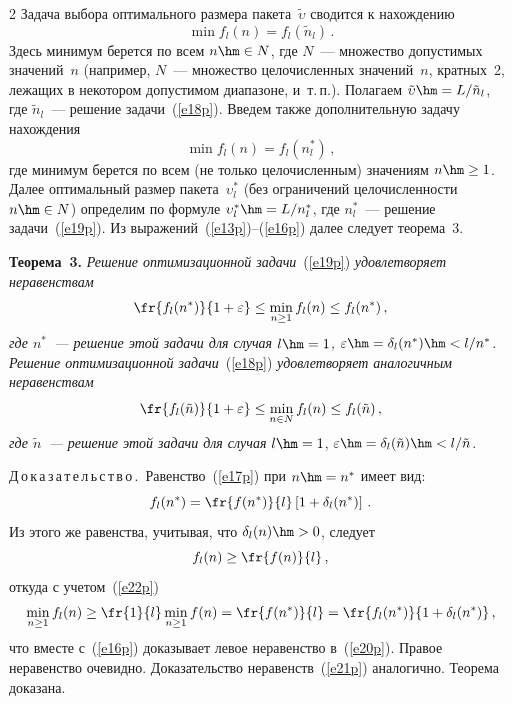 \begin{multicols}{2}
     Задача выбора оптимального размера пакета~$\tilde{\upsilon}$ сводится к 
нахождению 
     \begin{equation}
     \min f_l(n) =f_l\left(\tilde{n}_l\right)\,.
     \label{e18p}
     \end{equation}
Здесь минимум берется по всем $n\hm\in N$, где $N$~--- множество 
допустимых значений~$n$ (например, $N$~--- множество це\-ло\-чис\-лен\-ных 
значений~$n$, кратных~2, лежащих в некотором допустимом диапазоне, 
и~т.\,п.). Полагаем $\tilde{\upsilon}\hm=L/\tilde{n}_l$, где 
$\tilde{n}_l$~--- решение задачи~(\ref{e18p}). Введем также дополнительную 
задачу нахождения 
\begin{equation}
\min f_l(n) =f_l(n_l^*)\,,
\label{e19p}
\end{equation}
где минимум берется по всем (не только це\-ло\-чис\-лен\-ным) значениям 
$n\hm\geq 1$. Далее оптимальный размер пакета~$\upsilon_l^*$ (без 
ограничений це\-ло\-чис\-лен\-ности $n\hm\in N$) определим по формуле 
$\upsilon_l^*\hm=L/n_l^*$, где $n_l^*$~--- решение задачи~(\ref{e19p}). Из 
выражений~(\ref{e13p})--(\ref{e16p}) далее следует теорема~3.

\medskip

\noindent
\textbf{Теорема~3.} \textit{Решение оптимизационной задачи}~(\ref{e19p}) 
\textit{удовлетворяет неравенствам}
\begin{equation}
\fr{f_l(n^*)}{1+\varepsilon}\leq \min\limits_{n\geq 1} f_l(n)\leq f_l(n^*)\,,
\label{e20p} 
\end{equation}
\textit{где $n^*$~--- решение этой задачи для случая $l\hm=1$, 
$\varepsilon\hm=\delta_l(n^*)\hm<l/n^*$. Решение оптимизационной 
задачи}~(\ref{e18p}) \textit{удовлетворяет аналогичным неравенствам}
\begin{equation}
\fr{f_l(\tilde{n})}{1+\varepsilon}\leq \min\limits_{n\in N} f_l(n)\leq 
f_l(\tilde{n})\,, 
\label{e21p}
\end{equation}
\textit{где $\tilde{n}$~--- решение этой задачи для случая} $l\hm=1$, 
$\varepsilon\hm=\delta_l(\tilde{n})\hm<l/\tilde{n}$.
     
     \medskip
     
\noindent
     Д\,о\,к\,а\,з\,а\,т\,е\,л\,ь\,с\,т\,в\,о\,.\ Равенство~(\ref{e17p}) при 
$n\hm=n^*$ имеет вид:
     \begin{equation}
     f_l(n^*) =\fr{f(n^*)}{l}\left[ 1+\delta_l(n^*)\right]\,.
     \label{e22p}
     \end{equation}
Из этого же равенства, учитывая, что $\delta_l(n)\hm>0$, следует
$$
f_l(n)\geq \fr{f(n)}{l}\,,
$$
откуда с учетом~(\ref{e22p})
$$
\min\limits_{n\geq 1} f_l(n) \geq \fr{1}{l}\min\limits_{n\geq 1} f(n) 
=\fr{f(n^*)}{l}= \fr{f_l(n^*)}{1+\delta_l(n^*)}\,,
$$
что вместе с~(\ref{e16p}) доказывает левое неравенство в~(\ref{e20p}). 
Правое неравенство очевидно. Доказательство неравенств~(\ref{e21p}) 
аналогично. Теорема доказана.


\end{multicols}
